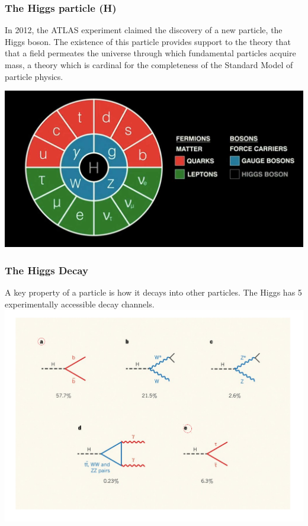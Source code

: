 \documentclass[pdf]{beamer}
\begin{document}
\begin{frame}
\frametitle{The Higgs particle (H)}
In 2012, the ATLAS experiment claimed the discovery of a new particle, the Higgs boson. The existence of this particle provides support to the theory that that a field permeates the universe through which fundamental particles acquire mass, a theory which is cardinal for the completeness of the Standard Model of particle physics.\\
\begin{center}
\includegraphics[scale=0.2]{standard_model.jpg}
\end{center}
\end{frame}

\begin{frame}
\frametitle{The Higgs Decay}
A key property of a particle is how it decays into other particles. The Higgs has 5 experimentally accessible decay channels.
\hspace*{-3mm}
\includegraphics[scale=0.4]{higgs_branching.pdf} 
\end{frame}
\end{document}

